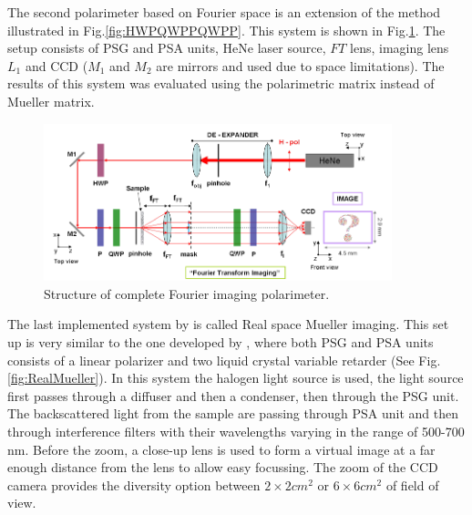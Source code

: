 \documentclass[oneside,a4,12p]{report} %
\begin{document}
The second polarimeter based on Fourier space is an extension of the method illustrated in Fig.\ref{fig:HWPQWPPQWPP}. This system is shown in Fig.\ref{fig:FourierTransformSystem}. The setup consists of PSG and PSA units, HeNe laser source, $FT$ lens, imaging lens $L_{1}$ and CCD ($M_{1}$ and $M_{2}$ are mirrors and used due to space limitations). The results of this system was evaluated using the polarimetric matrix instead of Mueller matrix. \\

	\begin{figure}
	\centering 
	\includegraphics[width = 0.9\textwidth]{figures/FourierTransformImaging.png}	
	\caption{Structure of complete Fourier imaging polarimeter.\cite{antonelli2011biomedical}}
	\label{fig:FourierTransformSystem}
	\end{figure}


The last implemented system by \cite{antonelli2011biomedical} is called Real space Mueller imaging. This set up is very similar to the one developed by \cite{de2004general}, where both PSG and PSA units consists of a linear polarizer and two liquid crystal variable retarder (See Fig.\ref{fig:RealMueller}). In this system the halogen light source is used, the light source first passes through a diffuser and then a condenser, then through the PSG unit. The backscattered light from the sample are passing through PSA unit and then through interference filters with their wavelengths varying in the range of 500-700 nm. Before the zoom, a close-up lens is used to form a virtual image at a far enough distance from the lens to allow easy focussing. The zoom of the CCD camera provides the diversity option between $2\times2 cm^{2}$ or $6\times6 cm^{2}$ of field of view. 
\end{document}
